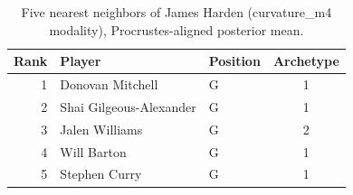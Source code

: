 \begin{table}[htbp]
  \centering\small
  \begin{tabular}{rllc}
    \toprule
    Rank & Player & Position & Archetype \\
    \midrule
    1 & Donovan Mitchell & G & 1 \\
    2 & Shai Gilgeous-Alexander & G & 1 \\
    3 & Jalen Williams & G & 2 \\
    4 & Will Barton & G & 1 \\
    5 & Stephen Curry & G & 1 \\
    \bottomrule
  \end{tabular}
  \caption{Five nearest neighbors of James Harden (curvature_m4 modality), Procrustes-aligned posterior mean.}
  \label{tab:James_Harden_neighbors_curvature_m4}
\end{table}

